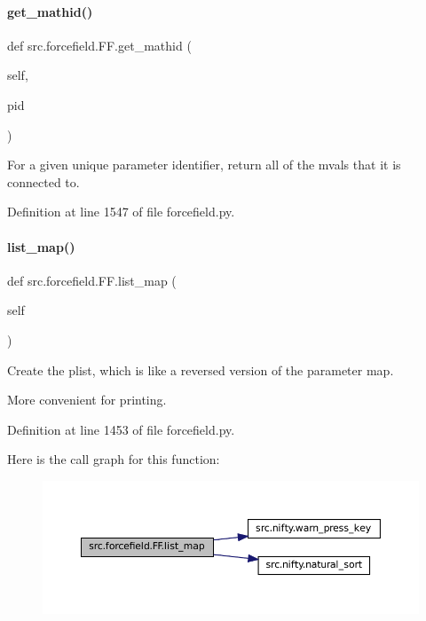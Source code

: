 \paragraph{\texorpdfstring{get\+\_\+mathid()}{get\_mathid()}}
{\footnotesize\ttfamily def src.\+forcefield.\+F\+F.\+get\+\_\+mathid (\begin{DoxyParamCaption}\item[{}]{self,  }\item[{}]{pid }\end{DoxyParamCaption})}



For a given unique parameter identifier, return all of the mvals that it is connected to. 



Definition at line 1547 of file forcefield.\+py.

\mbox{\label{classsrc_1_1forcefield_1_1FF_a49300acaa7a78760bc5c97d8635e6ce5}} 
\paragraph{\texorpdfstring{list\+\_\+map()}{list\_map()}}
{\footnotesize\ttfamily def src.\+forcefield.\+F\+F.\+list\+\_\+map (\begin{DoxyParamCaption}\item[{}]{self }\end{DoxyParamCaption})}



Create the plist, which is like a reversed version of the parameter map. 

More convenient for printing. 

Definition at line 1453 of file forcefield.\+py.

Here is the call graph for this function\+:
\nopagebreak
\begin{figure}[H]
\begin{center}
\leavevmode
\includegraphics[width=350pt]{classsrc_1_1forcefield_1_1FF_a49300acaa7a78760bc5c97d8635e6ce5_cgraph}
\end{center}
\end{figure}
\mbox{\label{classsrc_1_1forcefield_1_1FF_a3bd84ef07970f78b17145ca790e819b7}} 
